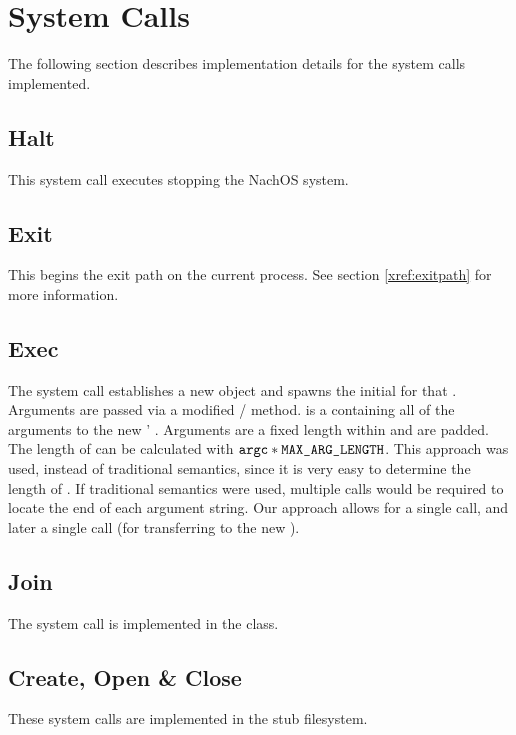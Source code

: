   \section{System Calls}
    The following section describes implementation details for the system calls
    implemented.

    \subsection{Halt}
      This system call executes  stopping the NachOS system.

    \subsection{Exit}
      This begins the exit path on the current process. See section \ref{xref:exitpath}
      for more information.

    \subsection{Exec}
    \label{xref:exec}
      The  system call establishes a new  object and spawns the
      initial  for that . Arguments are passed via a modified
      / method.  is a  containing all of
      the arguments to the new ' . Arguments are a fixed
      length within  and are  padded. The length of  can
      be calculated with $\texttt{argc} * \texttt{MAX\_ARG\_LENGTH}$. This approach was
      used, instead of traditional  semantics, since it is very easy
      to determine the length of . If traditional semantics were used,
      multiple  calls would be required to locate the end of each
      argument string. Our approach allows for a single  call, and
      later a single  call (for transferring  to the new
      ).

    \subsection{Join}
      The  system call is implemented in the  class.

    \subsection{Create, Open \& Close}
      These system calls are implemented in the stub filesystem.

